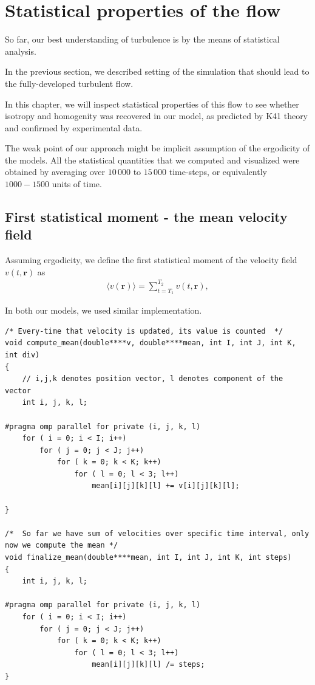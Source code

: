 \section{Statistical properties of the flow}

So far, our best understanding of turbulence is by the means of statistical analysis.

In the previous section, we described setting of the simulation that should lead to the fully-developed turbulent flow.

In this chapter, we will inspect statistical properties of this flow to see whether isotropy and homogenity was recovered in our model, as predicted by K41 theory and confirmed by experimental data.

The weak point of our approach might be implicit assumption of the ergodicity of the models.
All the statistical quantities that we computed and visualized were obtained by averaging over $10\,000$ to $15\,000$ time-steps, or equivalently $1000 - 1500$ units of time.

\subsection{First statistical moment - the mean velocity field}
Assuming ergodicity, we define the first statistical moment of the velocity field $v(t,\bm{r})$ as
\begin{align}
\langle v(\bm{r}) \rangle = \sum_{t = T_1}^{T_2} v(t,\bm{r}),
\end{align}

In both our models, we used similar implementation.
\begin{lstlisting}
/* Every-time that velocity is updated, its value is counted  */
void compute_mean(double****v, double****mean, int I, int J, int K, int div)
{
	// i,j,k denotes position vector, l denotes component of the vector
	int i, j, k, l;

#pragma omp parallel for private (i, j, k, l)
	for ( i = 0; i < I; i++)
		for ( j = 0; j < J; j++)
			for ( k = 0; k < K; k++)
				for ( l = 0; l < 3; l++)
					mean[i][j][k][l] += v[i][j][k][l];
	
}

/*  So far we have sum of velocities over specific time interval, only now we compute the mean */
void finalize_mean(double****mean, int I, int J, int K, int steps)
{
	int i, j, k, l;

#pragma omp parallel for private (i, j, k, l)
	for ( i = 0; i < I; i++)
		for ( j = 0; j < J; j++)
			for ( k = 0; k < K; k++)
				for ( l = 0; l < 3; l++)
					mean[i][j][k][l] /= steps;
}

\end{lstlisting}

